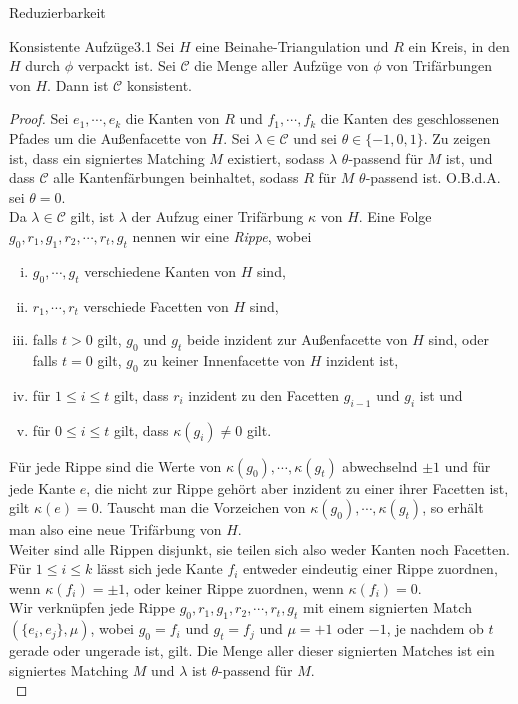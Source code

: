 \begin{section}{Reduzierbarkeit}
 \begin{satzl}{Konsistente Aufzüge}{3.1}
  Sei $H$ eine Beinahe-Triangulation und $R$ ein Kreis, in den $H$ durch $\phi$ verpackt ist. Sei $\mathscr{C}$ die Menge aller Aufzüge von $\phi$ von Trifärbungen von $H$. Dann ist $\mathscr{C}$ konsistent.
 \end{satzl}
 \begin{proof}
  Sei $e_1,\cdots,e_k$ die Kanten von $R$ und $f_1,\cdots,f_k$ die Kanten des geschlossenen Pfades um die Außenfacette von $H$. Sei $\lambda \in \mathscr{C}$ und sei $\theta \in \{-1,0,1\}$. Zu zeigen ist, dass ein signiertes Matching $M$ existiert, sodass $\lambda$ $\theta$-passend für $M$ ist, und dass $\mathscr{C}$ alle Kantenfärbungen beinhaltet, sodass $R$ für $M$ $\theta$-passend ist. O.B.d.A. sei $\theta = 0$.\\
  Da $\lambda \in \mathscr{C}$ gilt, ist $\lambda$ der Aufzug einer Trifärbung $\kappa$ von $H$. Eine Folge $g_0,r_1,g_1,r_2,\cdots,r_t,g_t$ nennen wir eine \textit{Rippe}, wobei
  \begin{enumerate}[(i)]
   \item $g_0,\cdots,g_t$ verschiedene Kanten von $H$ sind,
   \item $r_1,\cdots,r_t$ verschiede Facetten von $H$ sind,
   \item falls $t >0$ gilt, $g_0$ und $g_t$ beide inzident zur Außenfacette von $H$ sind, oder falls $t=0$ gilt, $g_0$ zu keiner Innenfacette von $H$ inzident ist,
   \item für $1\leq i\leq t$ gilt, dass $r_i$ inzident zu den Facetten $g_{i-1}$ und $g_i$ ist und
   \item für $0\leq i\leq t$ gilt, dass $\kappa(g_i) \neq 0$ gilt.
  \end{enumerate}
  Für jede Rippe sind die Werte von $\kappa(g_0),\cdots,\kappa(g_t)$ abwechselnd $\pm 1$ und für jede Kante $e$, die nicht zur Rippe gehört aber inzident zu einer ihrer Facetten ist, gilt $\kappa(e) = 0$. Tauscht man die Vorzeichen von $\kappa(g_0),\cdots,\kappa(g_t)$, so erhält man also eine neue Trifärbung von $H$.\\
  Weiter sind alle Rippen disjunkt, sie teilen sich also weder Kanten noch Facetten. Für $1 \leq i \leq k$ lässt sich jede Kante $f_i$ entweder eindeutig einer Rippe zuordnen, wenn $\kappa(f_i) = \pm 1$, oder keiner Rippe zuordnen, wenn $\kappa(f_i)=0$.\\
  Wir verknüpfen jede Rippe $g_0,r_1,g_1,r_2,\cdots,r_t,g_t$ mit einem signierten Match $(\{e_i,e_j\},\mu)$, wobei $g_0 = f_i$ und $g_t = f_j$ und $\mu = +1$ oder $-1$, je nachdem ob $t$ gerade oder ungerade ist, gilt. Die Menge aller dieser signierten Matches ist ein signiertes Matching $M$ und $\lambda$ ist $\theta$-passend für $M$.\\

\end{proof}
\end{section}
